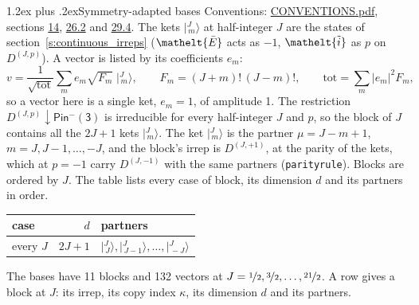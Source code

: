 \documentclass[10pt,a4paper]{article}
\makeatletter
\renewcommand\section{\@startsection{section}{1}{\z@}{-3ex plus -1ex minus -.2ex}%
  {1.2ex plus .2ex}{\normalfont\large\sffamily\bfseries\color{parttitle}}}
\numberwithin{equation}{section}
\newcommand{\eltfont}[1]{{\let\sigma\eltsigma\mathelt{#1}}}
\newcommand{\grp}[1]{\mathsf{#1}}
\newcommand{\elt}[1]{\eltfont{#1}}
\newcommand{\restr}[2]{#1\!\downarrow#2}
\newcommand{\irrJp}[2]{D^{(#1,#2)}}
\newcommand{\mult}{\kappa}
\newcommand{\intx}{\mu}
\newcommand{\jm}[2]{\bigl\lvert{}^{#1}_{\,#2}\bigr\rangle}
\newcommand{\barred}[1]{\bar{#1}}
\newcommand{\lift}[1]{\tilde{#1}}
\makeatother
\begin{document}
\section{Symmetry-adapted bases}\label{s:bases}
Conventions: \href{../../CONVENTIONS.pdf}{CONVENTIONS.pdf}, sections \href{../../../rotation/CONVENTIONS.pdf\#conv.14}{14}, \href{../../CONVENTIONS.pdf\#conv.26.2}{26.2} and \href{../../CONVENTIONS.pdf\#conv.29.4}{29.4}.
\leavevmode\label{n:index.m}\label{n:vector.ket}The kets $\jm{J}{m}$ at half-integer $J$ are the states of section~\ref{s:continuous_irreps} ($\elt{\barred{E}}$ acts as $-1$, $\elt{\lift{i}}$ as $p$ on $\irrJp{J}{p}$). \label{n:index.ketcoefficient}\label{n:vector.basis.symmetry}\label{n:index.ketweight}\label{n:index.total}A vector is listed by its coefficients $e_m$:
\begin{equation}\label{e:ket}v = \frac{1}{\sqrt{\mathrm{tot}}}\sum_m e_m\sqrt{F_m}\;\jm{J}{m},\qquad F_m = (J+m)!\,(J-m)!,\qquad \mathrm{tot} = \sum_m |e_m|^2F_m,\end{equation}
so a vector here is a single ket, $e_m = 1$, of amplitude 1.
The restriction $\restr{\irrJp{J}{p}}{\grp{Pin^{-}(3)}}$ is irreducible for every half-integer $J$ and $p$, so the block of $J$ contains all the $2J+1$ kets $\jm{J}{m}$. The ket $\jm{J}{m}$ is the partner $\intx = J - m + 1$, $m = J, J-1, \dots, -J$, and the block's irrep is $\irrJp{J}{+1}$, at the parity of the kets, which at $p = -1$ carry $\irrJp{J}{-1}$ with the same partners (\texttt{parityrule}). Blocks are ordered by $J$. \label{n:head.case}\label{n:head.partners}The table lists every case of block, its dimension $d$ and its partners in order.
\begin{center}\begin{tabular}{@{}lrl@{}}\toprule
case & $d$ & partners\\\midrule
every $J$ & $2J+1$ & $\jm{J}{J}, \jm{J}{J-1}, \dots, \jm{J}{-J}$\\
\bottomrule\end{tabular}\end{center}
The bases have 11 blocks and 132 vectors at $J = \nicefrac{1}{2}, \nicefrac{3}{2}, \dots, \nicefrac{21}{2}$. \label{n:index.copy}\label{n:head.irrep}A row gives a block at $J$: its irrep, its copy index $\mult$, its dimension $d$ and its partners.
\end{document}
